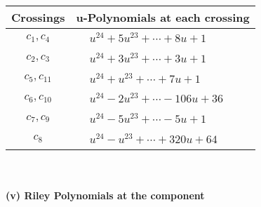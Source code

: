 \documentclass[1p]{elsarticle_modified}
\theoremstyle{definition}
\begin{document}
\begin{tabular}{m{50pt}|m{274pt}}
Crossings & \hspace{64pt}u-Polynomials at each crossing \\
\hline $$\begin{aligned}c_{1},c_{4}\end{aligned}$$&$\begin{aligned}
&u^{24}+5 u^{23}+\cdots+8 u+1
\end{aligned}$\\
\hline $$\begin{aligned}c_{2},c_{3}\end{aligned}$$&$\begin{aligned}
&u^{24}+3 u^{23}+\cdots+3 u+1
\end{aligned}$\\
\hline $$\begin{aligned}c_{5},c_{11}\end{aligned}$$&$\begin{aligned}
&u^{24}+u^{23}+\cdots+7 u+1
\end{aligned}$\\
\hline $$\begin{aligned}c_{6},c_{10}\end{aligned}$$&$\begin{aligned}
&u^{24}-2 u^{23}+\cdots-106 u+36
\end{aligned}$\\
\hline $$\begin{aligned}c_{7},c_{9}\end{aligned}$$&$\begin{aligned}
&u^{24}-5 u^{23}+\cdots-5 u+1
\end{aligned}$\\
\hline $$\begin{aligned}c_{8}\end{aligned}$$&$\begin{aligned}
&u^{24}- u^{23}+\cdots+320 u+64
\end{aligned}$\\
\hline
\end{tabular}\\~\\
\newpage\renewcommand{\arraystretch}{1}
\flushleft \textbf{(v) Riley Polynomials at the component}\newline \\
\end{document}
